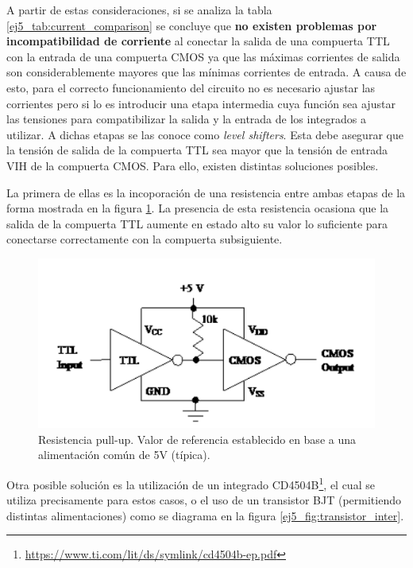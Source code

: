 \noindent
A partir de estas consideraciones, si se analiza la tabla \ref{ej5_tab:current_comparison} se concluye que \textbf{no existen problemas por incompatibilidad de corriente} al conectar la salida de una compuerta TTL con la entrada de una compuerta CMOS ya que las m\'aximas corrientes de salida son considerablemente mayores que las m\'inimas corrientes de entrada. A causa de esto, para el correcto funcionamiento del circuito no es necesario ajustar las corrientes pero si lo es introducir una etapa intermedia cuya funci\'on sea ajustar las tensiones para compatibilizar la salida y la entrada de los integrados a utilizar. A dichas etapas se las conoce como \textit{level shifters}. Esta debe asegurar que la tensi\'on de salida de la compuerta TTL sea mayor que la tensi\'on de entrada VIH de la compuerta CMOS. Para ello, existen distintas soluciones posibles.

\noindent
La primera de ellas es la incoporaci\'on de una resistencia entre ambas etapas de la forma mostrada en la figura \ref{ej5_fig:pull_up_res}. La presencia de esta resistencia ocasiona que la salida de la compuerta TTL aumente en estado alto su valor lo suficiente para conectarse correctamente con la compuerta subsiguiente.

\begin{figure}[H]
    \centering
    \includegraphics[scale=0.5]{figs/ej5/res_inter.png}
    \caption{Resistencia pull-up. Valor de referencia establecido en base a una alimentaci\'on com\'un de 5V (t\'ipica).}
    \label{ej5_fig:pull_up_res}
\end{figure}

\noindent
Otra posible soluci\'on es la utilizaci\'on de un integrado CD4504B\footnote{\href{https://www.ti.com/lit/ds/symlink/cd4504b-ep.pdf}{https://www.ti.com/lit/ds/symlink/cd4504b-ep.pdf}}, el cual se utiliza precisamente para estos casos, o el uso de un transistor BJT (permitiendo distintas alimentaciones) como se diagrama en la figura \ref{ej5_fig:transistor_inter}.

